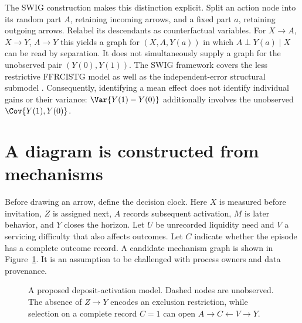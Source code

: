 The SWIG construction makes this distinction explicit. Split an action node
into its random part $A$, retaining incoming arrows, and a fixed part $a$,
retaining outgoing arrows. Relabel its descendants as counterfactual
variables. For $X\to A$, $X\to Y$, $A\to Y$ this yields a graph for
$(X,A,Y(a))$ in which $A\perp Y(a)\mid X$ can be read by separation.
It does not simultaneously supply a graph for the unobserved pair
$(Y(0),Y(1))$. The SWIG framework covers the less restrictive FFRCISTG
model as well as the independent-error structural submodel
\citep[Section 2, node splitting and modularity]{swig2013}. Consequently,
identifying a mean effect does not identify individual gains or their
variance: $\Var\{Y(1)-Y(0)\}$ additionally involves the unobserved
$\Cov\{Y(1),Y(0)\}$.

\section{A diagram is constructed from mechanisms}
\label{r3:graph-construction}
Before drawing an arrow, define the decision clock. Here $X$ is measured
before invitation, $Z$ is assigned next, $A$ records subsequent activation,
$M$ is later behavior, and $Y$ closes the horizon. Let $U$ be unrecorded
liquidity need and $V$ a servicing difficulty that also affects outcomes.
Let $C$ indicate whether the episode has a complete outcome record. A
candidate mechanism graph is shown in Figure~\ref{r3:bank-graph}. It is
an assumption to be challenged with process owners and data provenance.

\begin{figure}[htbp]\centering
{}
\caption{A proposed deposit-activation model. Dashed nodes are unobserved.
The absence of $Z\to Y$ encodes an exclusion restriction, while selection
on a complete record $C=1$ can open $A\to C\leftarrow V\to Y$.}
\label{r3:bank-graph}
\end{figure}


